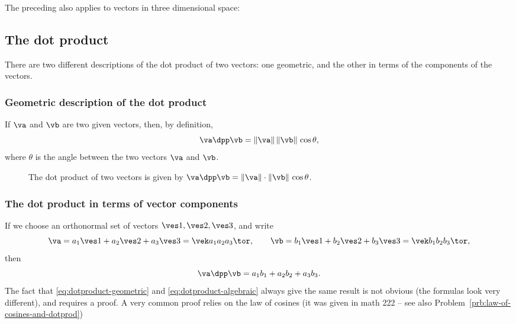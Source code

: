 The preceding also applies to vectors in three dimensional space:
\begin{figure}[h]\sffamily\color{darkbluegreen}
  
\end{figure}

\subsection{The dot product} %
There are two different descriptions of the dot product of two
vectors: one geometric, and the other in terms of the components of
the vectors.

\subsubsection*{Geometric description of the dot product}
If $\va$ and $\vb$ are two given vectors, then, by definition,
\[
\va\dpp\vb = \|\va\| \, \|\vb\|\,\cos \theta,
\]
where $\theta$ is the angle between the two vectors $\va$ and $\vb$.
\begin{figure}[t]
  \centering
  
  \caption{The dot product of two vectors is given by $\va\dpp\vb = \|\va\| \cdot 
  \|\vb\|\,\cos \theta$.}
\end{figure}

\subsubsection*{The dot product in terms of vector components} If we choose an
orthonormal set of vectors $\ves1,\ves2,\ves3$, and write 
\begin{equation}
  \label{eq:dotproduct-geometric}
  \va = a_1\ves1+a_2\ves2+a_3\ves3=\vek a_1 \\ a_2 \\ a_3 \tor,\qquad
  \vb = b_1\ves1+b_2\ves2+b_3\ves3=\vek b_1 \\ b_2 \\ b_3 \tor,
\end{equation}
then
\begin{equation}
  \label{eq:dotproduct-algebraic}
  \va\dpp\vb = a_1b_1 + a_2b_2 + a_3b_3.
\end{equation}
The fact that \eqref{eq:dotproduct-geometric} and \eqref{eq:dotproduct-algebraic}
always give the same result is not obvious (the formulas look very different), and
requires a proof.  A very common proof relies on the law of cosines (it was given in
math 222 -- see also Problem~\ref{prb:law-of-cosines-and-dotprod})

